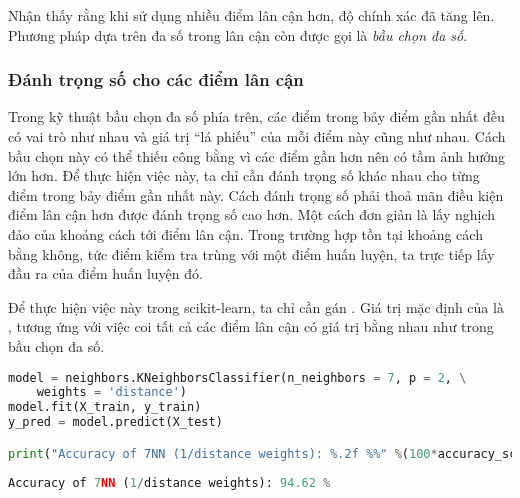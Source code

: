 Nhận thấy rằng khi sử dụng nhiều điểm lân cận hơn, độ chính xác đã tăng lên. Phương pháp dựa trên đa số trong lân cận còn được gọi là \textit{bầu chọn đa số}.







\subsubsection{Đánh trọng số cho các điểm lân cận}
Trong kỹ thuật bầu chọn đa số phía trên, các điểm trong bảy điểm gần nhất đều có
vai trò như nhau và giá trị ``lá phiếu'' của mỗi điểm này cũng như nhau. Cách bầu chọn này có thể thiếu công bằng vì các điểm gần hơn nên có tầm ảnh hưởng lớn hơn. Để thực hiện việc này, ta chỉ cần đánh trọng số khác nhau cho từng điểm trong bảy điểm gần nhất này. Cách
đánh trọng số phải thoả mãn điều kiện điểm lân cận hơn được đánh trọng số cao hơn. Một cách đơn giản là lấy nghịch đảo của khoảng
cách tới điểm lân cận. Trong trường hợp tồn tại khoảng cách bằng không, tức điểm kiểm tra trùng với một điểm huấn luyện, ta trực tiếp lấy đầu ra của điểm huấn luyện đó.

Để thực hiện việc này trong scikit-learn, ta chỉ cần gán
. Giá trị mặc định của
 là , tương ứng với việc coi tất
cả các điểm lân cận có giá trị bằng nhau như trong bầu chọn đa số.

\begin{lstlisting}[language=Python]
model = neighbors.KNeighborsClassifier(n_neighbors = 7, p = 2, \
    weights = 'distance')
model.fit(X_train, y_train)
y_pred = model.predict(X_test)

print("Accuracy of 7NN (1/distance weights): %.2f %%" %(100*accuracy_score(y_test, y_pred)))
\end{lstlisting}
\kq
\begin{lstlisting}[language=Python]
Accuracy of 7NN (1/distance weights): 94.62 %
\end{lstlisting}

